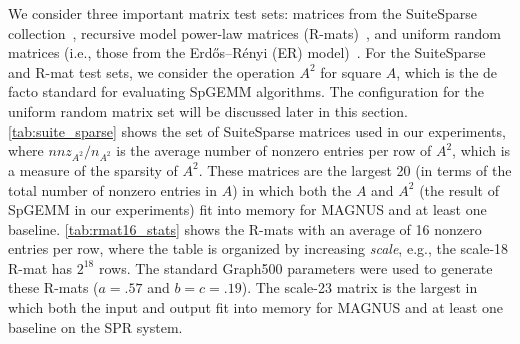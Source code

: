 \begin{table}[htbp]
\caption{Properties of the RMat16 matrices (R-mats with an average of 16 nonzero entries per row).
The standard Graph500 parameters are used ($a = .57$ and $b = c = .19$).}
\begin{center}
\label{tab:rmat16_stats}
\end{center}
\end{table}

We consider three important matrix test sets: matrices from the SuiteSparse collection~\cite{suitesparse}, recursive model power-law matrices (R-mats)~\cite{rmat}, and uniform random matrices (i.e., those from the Erd\H{o}s--R\'enyi (ER) model)~\cite{erdosrenyi}.
For the SuiteSparse and R-mat test sets, we consider the operation $A^2$ for square $A$, which is the de facto standard for evaluating SpGEMM algorithms.
The configuration for the uniform random matrix set will be discussed later in this section.
\autoref{tab:suite_sparse} shows the set of SuiteSparse matrices used in our experiments, where $nnz_{A^2}/n_{A^2}$ is the average number of nonzero entries per row of $A^2$, which is a measure of the sparsity of $A^2$.
These matrices are the largest 20 (in terms of the total number of nonzero entries in $A$) in which both the $A$ and $A^2$ (the result of SpGEMM in our experiments) fit into memory for MAGNUS and at least one baseline.
\autoref{tab:rmat16_stats} shows the R-mats with an average of 16 nonzero entries per row, where the table is organized by increasing \emph{scale}, e.g., the scale-18 R-mat has $2^{18}$ rows.
The standard Graph500 parameters were used to generate these R-mats ($a = .57$ and $b = c = .19$).
The scale-23 matrix is the largest in which both the input
and output fit into memory for MAGNUS and at least one baseline on the SPR system.

